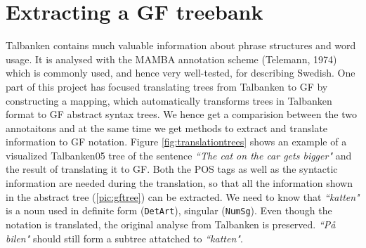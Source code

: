 \documentclass{report}
\begin{document}
\chapter{Extracting a GF treebank} %
\label{sec:Mapping}
Talbanken contains much valuable information about phrase structures and word 
usage. It is analysed with the MAMBA annotation scheme (Telemann, 1974) which is 
commonly used, and hence very well-tested, for describing Swedish.
One part of this project has focused translating trees from Talbanken to GF
by constructing a mapping, which 
automatically transforms trees in Talbanken format to GF abstract syntax trees.
We hence get a comparision between the two annotaitons and at the same time
we get methods to extract and translate information to GF notation. 
Figure \ref{fig:translationtrees} shows an example of a visualized Talbanken05 tree
of the sentence \emph{``The cat on the car gets bigger"} and the result of translating it to GF.
Both the POS tags as well as the syntactic information are needed
during the translation, so that all the information shown in the abstract tree
(\ref{pic:gftree}) can be extracted. We need to know that \emph{``katten"} is a noun
used in definite form (\verb-DetArt-), singular (\verb-NumSg-). Even though the
notation is translated, the original analyse from Talbanken
is preserved.
\emph{``På bilen"} should still form a subtree attatched to \emph{``katten"}.
\end{document}
